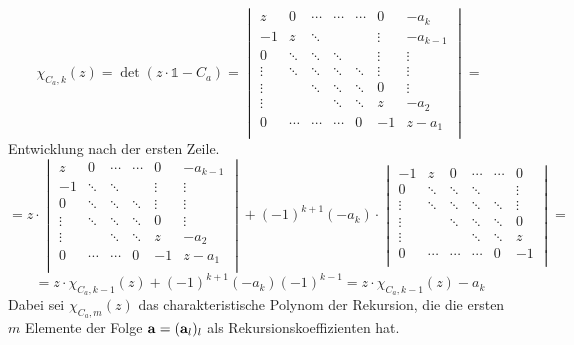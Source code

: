 \begin{flushenum}
\item
	\[ \chi_{C_a, k}(z) = \det ( z\cdot \mathds{1} - C_a) = 
		\begin{vmatrix}
			z      & 0      & \cdots & \cdots & \cdots & 0      & -a_k     \\
			-1     & z      & \ddots &        &        & \vdots & -a_{k-1} \\
			0      & \ddots & \ddots & \ddots &        & \vdots & \vdots   \\
			\vdots & \ddots & \ddots & \ddots & \ddots & \vdots & \vdots   \\
			\vdots &        & \ddots & \ddots & \ddots & 0      & \vdots   \\
			\vdots &        &        & \ddots & \ddots & z      & -a_2     \\
			0      & \cdots & \cdots & \cdots & 0      & -1     & z - a_1  \\
		\end{vmatrix} = \]
	Entwicklung nach der ersten Zeile.
	\[ = z \cdot \begin{vmatrix}
			z      & 0      & \cdots & \cdots & 0      & -a_{k-1} \\
			-1     & \ddots & \ddots &        & \vdots & \vdots   \\
			0      & \ddots & \ddots & \ddots & \vdots & \vdots   \\
			\vdots & \ddots & \ddots & \ddots & 0      & \vdots   \\
			\vdots &        & \ddots & \ddots & z      & -a_2     \\
			0      & \cdots & \cdots & 0      & -1     & z - a_1  \\
		\end{vmatrix} + (-1)^{k+1}(-a_k) \cdot
		\begin{vmatrix}
			-1     & z      & 0      & \cdots & \cdots & 0      \\
			0      & \ddots & \ddots & \ddots &        & \vdots \\
			\vdots & \ddots & \ddots & \ddots & \ddots & \vdots \\
			\vdots &        & \ddots & \ddots & \ddots & 0      \\
			\vdots &        &        & \ddots & \ddots & z      \\
			0      & \cdots & \cdots & \cdots & 0      & -1     \\
		\end{vmatrix} = \]
	\[ = z \cdot \chi_{C_a, k-1}(z) + (-1)^{k+1}(-a_k)(-1)^{k-1} = z \cdot \chi_{C_a, k-1}(z) - a_k \]
	Dabei sei $\chi_{C_a, m}(z)$ das charakteristische Polynom der
	Rekursion, die die ersten $m$ Elemente der Folge ${\bf a} = ({\bf
	a}_l)_l$ als Rekursionskoeffizienten hat.


\end{flushenum}
